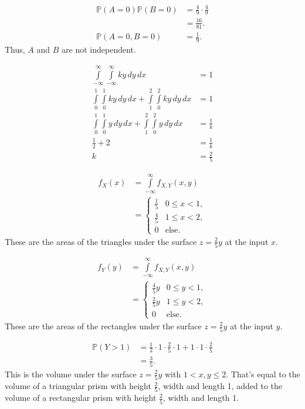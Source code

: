 \documentclass[12pt]{article}
\begin{document}
\medskip
{}
\begin{align*}
    \mathbb P(A = 0) \mathbb P(B = 0) &= \frac49 \cdot \frac49 \\
                                      &= \frac{16}{81}. \\
    \mathbb P(A = 0, B = 0) &= \frac19.
\end{align*} Thus, $A$ and $B$ are not independent.

\newpage
{}

\medskip
{}
\begin{align*}
    \int\limits_{-\infty}^\infty \int\limits_{-\infty}^\infty ky\,dy\,dx &= 1 \\
    \int\limits_0^1\int\limits_0^1ky\,dy\,dx + \int\limits_1^2\int\limits_0^2 ky\,dy\,dx &= 1 \\
    \int\limits_0^1\int\limits_0^1y\,dy\,dx + \int\limits_1^2\int\limits_0^2 y\,dy\,dx &= \frac1k \\
    \frac12 + 2 &= \frac1k \\
    k &= \frac25
\end{align*}

\medskip
{}
\begin{align*}
    f_X(x) &= \int\limits_{-\infty}^\infty f_{X,Y}(x,y) \\
           &= \begin{cases} \frac15 & 0 \leq x < 1, \\
                            \frac45 & 1 \leq x < 2, \\
                            0 & \text{else.} \end{cases}
\end{align*} These are the areas of the triangles under the surface $z=\frac25y$ at the input $x$.

\begin{align*}
    f_Y(y) &= \int\limits_{-\infty}^\infty f_{X,Y}(x,y) \\
           &= \begin{cases} \frac45y & 0 \leq y < 1, \\
                            \frac25y & 1 \leq y < 2, \\
                            0 & \text{else.} \end{cases}
\end{align*} These are the areas of the rectangles under the surface $z=\frac25y$ at the input $y$.

\newpage
{}
\begin{align*}
    \mathbb P(Y > 1) &= \frac12 \cdot 1 \cdot \frac25 \cdot 1 + 1 \cdot 1 \cdot \frac25 \\
                     &= \frac35.
\end{align*} This is the volume under the surface $z=\frac25y$ with $1 < x,y \leq 2$. That's equal to the volume of a triangular prism with height $\frac25$, width and length 1, added to the volume of a rectangular prism with height $\frac25$, width and length 1.
\end{document}
